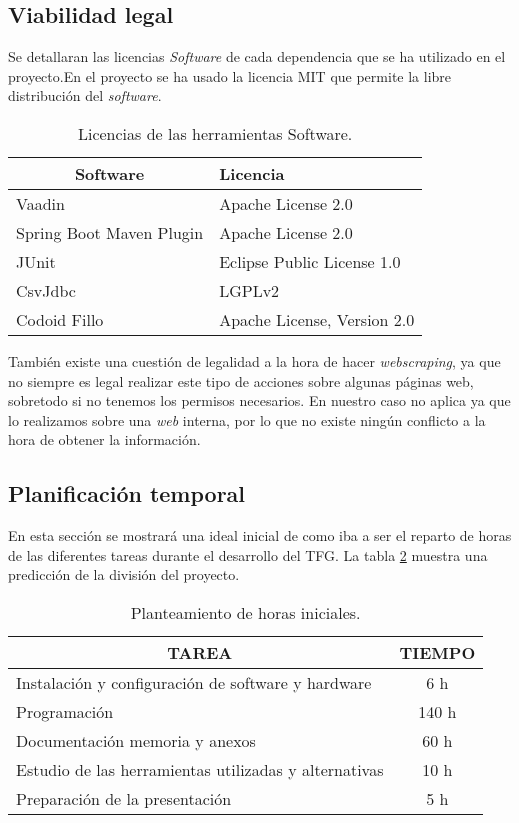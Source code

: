 \subsection{Viabilidad legal}
Se detallaran las licencias \emph{Software} de cada dependencia que se ha utilizado en el proyecto.En el proyecto se ha usado la licencia MIT que permite la libre distribución del \emph{software}.

\begin{table}[]
	\label{Dependencias del proyecto}
	\centering
	\begin{tabular}{|l|l|}
		\hline
		\multicolumn{1}{|c|}{\textbf{Software}}     & \textbf{Licencia} \\ \hline
		Vaadin & Apache License 2.0 \\ \hline
		Spring Boot Maven Plugin & Apache License 2.0 \\ \hline
		JUnit & Eclipse Public License 1.0 \\	\hline
		CsvJdbc & LGPLv2 \\ \hline
		Codoid Fillo & Apache License, Version 2.0 \\ \hline
	\end{tabular}
	\caption{Licencias de las herramientas Software.}
\end{table}

También existe una cuestión de legalidad a la hora de hacer \emph{webscraping}, ya que no siempre es legal realizar este tipo de acciones sobre algunas páginas web, sobretodo si no tenemos los permisos necesarios. En nuestro caso no aplica ya que lo realizamos sobre una \emph{web} interna, por lo que no existe ningún conflicto a la hora de obtener la información.

\subsection{Planificación temporal}

En esta sección se mostrará una ideal inicial de como iba a ser el reparto de horas de las diferentes tareas durante el desarrollo del TFG. La tabla \ref{horas} muestra una predicción de la división del proyecto.


\begin{table}[]
	\label{horas}
	\centering
	\begin{tabular}{|l|c|}
		\hline
		\multicolumn{1}{|c|}{\textbf{TAREA}}     & \textbf{TIEMPO} \\ \hline
		Instalación y configuración de software y hardware & 6 h  \\ \hline
		Programación                            & 140 h         \\ \hline
		Documentación memoria y anexos          & 60 h          \\ \hline
		Estudio de las herramientas utilizadas y alternativas & 10 h \\ \hline
		Preparación de la presentación		    & 5 h           \\ \hline
	\end{tabular}
	\caption{Planteamiento de horas iniciales.}
\end{table}
